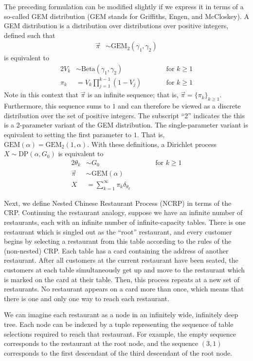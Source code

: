\documentclass{article}
\begin{document}
The preceding formulation can be modified slightly if we express it in terms of a so-called GEM distribution (GEM stands for Griffiths, Engen, and McCloskey).
A GEM distribution is a distribution over distributions over positive integers, defined such that
\begin{align*}
\vec \pi &\sim \text{GEM}_2(\gamma_1, \gamma_2)
\end{align*}
is equivalent to
\begin{alignat*}{2}
V_k &\sim \text{Beta}(\gamma_1, \gamma_2) &\qquad& \text{for $k \geq 1$} \\
\pi_k &= V_k \prod_{j=1}^{k-1} (1 - V_j) &\qquad& \text{for $k \geq 1$}
\end{alignat*}
Note in this context that $\vec \pi$ is an infinite sequence; that is, $\vec \pi = \{ \pi_k \}_{k \geq 1}$.
Furthermore, this sequence sums to $1$ and can therefore be viewed as a discrete distribution over the set of positive integers.
The subscript ``2'' indicates the this is a 2-parameter variant of the GEM distribution.
The single-parameter variant is equivalent to setting the first parameter to $1$.
That is, $\text{GEM}(\alpha) = \text{GEM}_2(1, \alpha)$.
With these definitions, a Dirichlet process $X \sim \text{DP}(\alpha, G_0)$ is equivalent to
\begin{alignat*}{2}
\theta_k &\sim G_0 &\qquad& \text{for $k \geq 1$} \\
\vec \pi &\sim \text{GEM}(\alpha) && \\
X &= \sum_{k=1}^\infty \pi_k \delta_{\theta_k} &&
\end{alignat*}

Next, we define Nested Chinese Restaurant Process (NCRP) in terms of the CRP.
Continuing the restaurant analogy, suppose we have an infinite number of restaurants, each with an infinite number of infinite-capacity tables.
There is one restaurant which is singled out as the ``root'' restaurant, and every customer begins by selecting a restaurant from this table according to the rules of the (non-nested) CRP.
Each table has a card containing the address of another restaurant.
After all customers at the current restaurant have been seated, the customers at each table simultaneously get up and move to the restaurant which is marked on the card at their table.
Then, this process repeats at a new set of restaurants.
No restaurant appears on a card more than once, which means that there is one and only one way to reach each restaurant.

We can imagine each restaurant as a node in an infinitely wide, infinitely deep tree.
Each node can be indexed by a tuple representing the sequence of table selections required to reach that restaurant.
For example, the empty sequence corresponds to the restaurant at the root node, and the sequence $(3, 1)$ corresponds to the first descendant of the third descendant of the root node.
\end{document}
